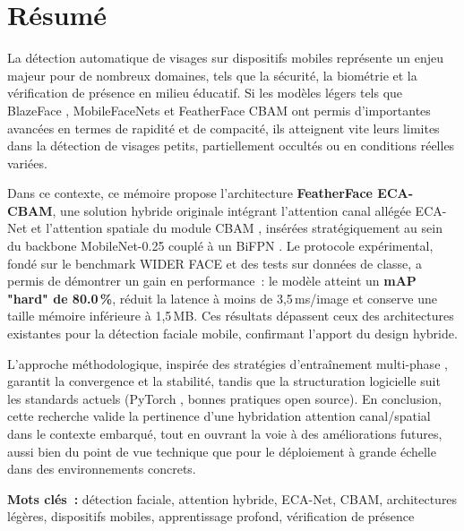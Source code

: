 \chapter*{Résumé}

La détection automatique de visages sur dispositifs mobiles représente un enjeu majeur pour de nombreux domaines, tels que la sécurité, la biométrie et la vérification de présence en milieu éducatif. Si les modèles légers tels que BlazeFace \cite{Zhang2019BlazeFace}, MobileFaceNets \cite{Chen2018MobileFaceNets} et FeatherFace CBAM \cite{Kim2025FeatherFace} ont permis d'importantes avancées en termes de rapidité et de compacité, ils atteignent vite leurs limites dans la détection de visages petits, partiellement occultés ou en conditions réelles variées.

Dans ce contexte, ce mémoire propose l'architecture \textbf{FeatherFace ECA-CBAM}, une solution hybride originale intégrant l'attention canal allégée ECA-Net \cite{Wang2020ECANet} et l'attention spatiale du module CBAM \cite{Woo2018CBAM}, insérées stratégiquement au sein du backbone MobileNet-0.25 couplé à un BiFPN \cite{Tan2020EfficientDet}. Le protocole expérimental, fondé sur le benchmark WIDER FACE \cite{Yang2016WIDERFACE} et des tests sur données de classe, a permis de démontrer un gain en performance~: le modèle atteint un \textbf{mAP "hard" de 80.0\,\%}, réduit la latence à moins de 3,5\,ms/image et conserve une taille mémoire inférieure à 1,5\,MB. Ces résultats dépassent ceux des architectures existantes pour la détection faciale mobile, confirmant l'apport du design hybride.

L'approche méthodologique, inspirée des stratégies d'entraînement multi-phase \cite{Wang2024ECACBAM}, garantit la convergence et la stabilité, tandis que la structuration logicielle suit les standards actuels (PyTorch \cite{Paszke2019PyTorch}, bonnes pratiques open source). En conclusion, cette recherche valide la pertinence d'une hybridation attention canal/spatial dans le contexte embarqué, tout en ouvrant la voie à des améliorations futures, aussi bien du point de vue technique que pour le déploiement à grande échelle dans des environnements concrets.

\vspace{1cm}

\noindent\textbf{Mots clés~:} détection faciale, attention hybride, ECA-Net, CBAM, architectures légères, dispositifs mobiles, apprentissage profond, vérification de présence
